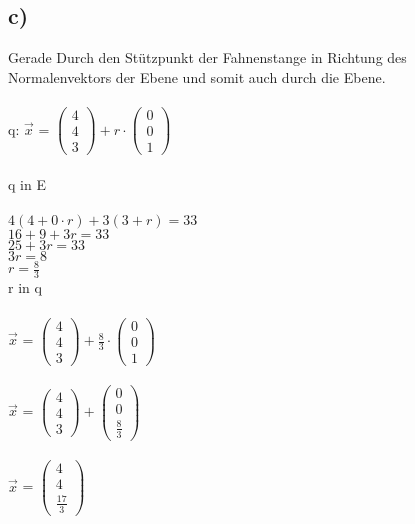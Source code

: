 \documentclass{article}
\begin{document}
	\subsection*{c)}
	Gerade Durch den Stützpunkt der Fahnenstange in Richtung des Normalenvektors der Ebene und somit auch durch die Ebene. \\ \\
	q: 
	$\vec{x}$ =
	$\left(
	\begin{array}{c}
	 4\\4\\3
	\end{array}
	\right)
	+
	r
	\cdot	
	\left(
	\begin{array}{c}
	0 \\ 0 \\ 1
	\end{array}
	\right)
	$ \\ \\
	q in E \\ \\
	$4(4 + 0 \cdot r) + 3(3 + r) = 33$ \\
	$16 + 9 + 3r = 33$ \\
	$25 + 3r = 33$ \\
	$3r = 8$ \\
	$r = \frac{8}{3}$
	\\
	r in q \\ \\
	$\vec{x}$ =
	$\left(
	\begin{array}{c}
	4\\4\\3
	\end{array}
	\right)
	+
	\frac{8}{3}
	\cdot	
	\left(
	\begin{array}{c}
	0\\ 0 \\ 1
	\end{array}
	\right)
	$ \\ \\
	$\vec{x}$ =
	$\left(
	\begin{array}{c}
	4\\4\\3
	\end{array}
	\right)
	+
	\left(
	\begin{array}{c}
	0\\0\\\frac{8}{3}
	\end{array}
	\right)
	$ \\ \\
	$\vec{x}$ =
	$\left(
	\begin{array}{c}
	4\\4\\\frac{17}{3}
	\end{array}
	\right)$ \\
	\\
	
\end{document}
